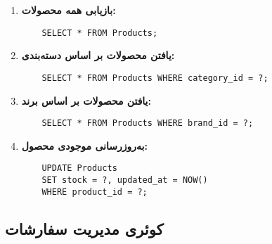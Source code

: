 \documentclass[12pt]{article}
\begin{document}
\begin{enumerate}
    \item \textbf{بازیابی همه محصولات:}
    \begin{latin}
    \begin{verbatim}
    SELECT * FROM Products;
    \end{verbatim}
    \end{latin}
    
    \item \textbf{یافتن محصولات بر اساس دسته‌بندی:}
    \begin{latin}
    \begin{verbatim}
    SELECT * FROM Products WHERE category_id = ?;
    \end{verbatim}
    \end{latin}
    
    \item \textbf{یافتن محصولات بر اساس برند:}
    \begin{latin}
    \begin{verbatim}
    SELECT * FROM Products WHERE brand_id = ?;
    \end{verbatim}
    \end{latin}
    
    \item \textbf{به‌روزرسانی موجودی محصول:}
    \begin{latin}
    \begin{verbatim}
    UPDATE Products
    SET stock = ?, updated_at = NOW()
    WHERE product_id = ?;
    \end{verbatim}
    \end{latin}
\end{enumerate}

\subsection{کوئری مدیریت سفارشات}
\end{document}
